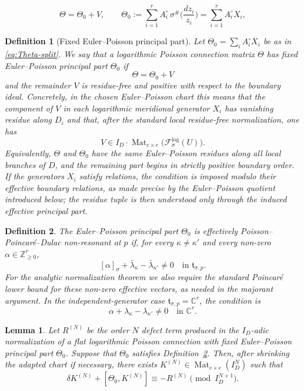 \documentclass[10pt,a4paper]{amsart}
\newtheorem{definition}{Definition}
\newtheorem{lemma}{Lemma}
\newcommand{\C}{\mathbb{C}}
\DeclareMathOperator{\Mat}{Mat}
\newcommand{\ZZ}{\mathbb Z}
\newcommand{\fol}{\mathcal{F}}
\begin{document}
\begin{equation}\label{eq:Theta-split}
\Theta=\Theta_0+V,
\qquad
\Theta_0:=\sum_{i=1}^r A_i^\circ\,\sigma^\#\Big(\frac{dz_i}{z_i}\Big)=\sum_{i=1}^r A_i^\circ X_i,
\end{equation}

\begin{definition}[Fixed Euler--Poisson principal part]\label{def:fixed-EP-principal-part}
Let $\Theta_0=\sum_i A_i^\circ X_i$ be as in \eqref{eq:Theta-split}.  We say that a logarithmic Poisson connection matrix $\Theta$ has \emph{fixed Euler--Poisson principal part} $\Theta_0$ if
\[
\Theta=\Theta_0+V
\]
and the remainder $V$ is residue-free and positive with respect to the boundary ideal.  Concretely, in the chosen Euler--Poisson chart this means that the component of $V$ in each logarithmic meridional generator $X_i$ has vanishing residue along $D_i$ and that, after the standard local residue-free normalization, one has
\begin{equation}\label{eq:residue-free-positive}
V\in I_D\cdot \Mat_{e\times e}\big(\fol_\sigma^{\log}(U)\big).
\end{equation}
Equivalently, $\Theta$ and $\Theta_0$ have the same Euler--Poisson residues along all local branches of $D$, and the remaining part begins in strictly positive boundary order.  If the generators $X_i$ satisfy relations, the condition is imposed modulo their effective boundary relations, as made precise by the Euler--Poisson quotient introduced below; the residue tuple is then understood only through the induced effective principal part.
\end{definition}

\begin{definition}\label{def:nonres}
The Euler--Poisson principal part $\Theta_0$ is effectively
Poisson--Poincar\'e--Dulac non-resonant at $p$ if, for every
$\kappa\neq\kappa'$ and every non-zero $\alpha\in\ZZ_{\ge0}^r$,
\[
        [\alpha]_\sigma
        +
        \bar\lambda_\kappa
        -
        \bar\lambda_{\kappa'}
        \neq
        0
        \quad\text{in }\mathfrak t_{\sigma,p}.
\]
For the analytic normalization theorem we also require the standard Poincar\'e
lower bound for these non-zero effective vectors, as needed in the majorant
argument.  In the independent-generator case $\mathfrak t_{\sigma,p}=\C^r$, the
condition is
\[
        \alpha+\lambda_\kappa-\lambda_{\kappa'}\neq0
        \quad\text{in }\C^r .
\]
\end{definition}

\begin{lemma}\label{lem:EP-homological-equation}
Let $R^{(N)}$ be the order $N$ defect term produced in the $I_D$-adic
normalization of a flat logarithmic Poisson connection with fixed
Euler--Poisson principal part $\Theta_0$.  Suppose that $\Theta_0$ satisfies
Definition~\ref{def:nonres}.  Then, after shrinking the adapted chart if
necessary, there exists $K^{(N)}\in\Mat_{e\times e}(I_D^N)$ such that
\[
        \delta K^{(N)}+[\Theta_0,K^{(N)}]
        \equiv
        -R^{(N)}
        \pmod {I_D^{N+1}} .
\]
\end{lemma}
\end{document}
